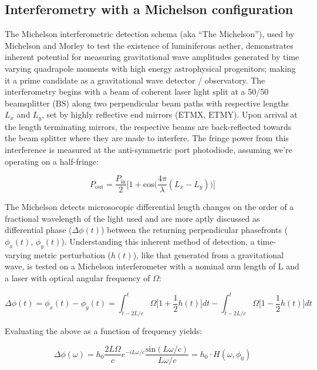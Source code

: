 \subsection{Interferometry with a Michelson configuration}
The Michelson interferometric detection schema (aka ``The Michelson''), used by Michelson and Morley to test the existence of luminiferous aether, demonstrates inherent potential for measuring gravitational wave amplitudes generated by time varying quadrapole moments with high energy astrophysical progenitors; making it a prime candidate as a gravitational wave detector / observatory. The interferometry begins with a beam of coherent laser light split at a 50/50 beamsplitter ($\mathrm{BS}$) along two perpendicular beam paths with respective lengths $L_x$ and $L_y$, set by highly reflective end mirrors ($\mathrm{ETMX}$, $\mathrm{ETMY}$). Upon arrival at the length terminating mirrors, the respective beams are back-reflected towards the beam splitter where they are made to interfere. The fringe power from this interference is measured at the anti-symmetric port photodiode, assuming we're operating on a half-fringe: 

\begin{equation}\label{fig:pmichas}
	P_\mathrm{out} = \frac{P_\mathrm{in}}{2} \bigg[1+\mathrm{cos}\Big(\frac{4\pi}{\lambda} (L_x - L_y)\Big) \bigg]
\end{equation}

The Michelson detects microsocopic differential length changes on the order of a fractional wavelength of the light used and are more aptly discussed as differential phase ($\Delta \phi(t)$) between the returning perpendicular phasefronts ($\phi_x(t)$, $\phi_y(t)$). Understanding this inherent method of detection, a time-varying metric perturbation ($h(t)$), like that generated from a gravitational wave, is tested on a Michelson interferometer with a nominal arm length of L and a laser with optical angular frequency of $\Omega$:

\begin{equation}
\Delta \phi(t) = \phi_x(t) - \phi_y(t) =  \int_{t-2L/c}^{t} \Omega \bigg[1 + \frac{1}{2}h(t)\bigg]dt - \int_{t-2L/c}^{t} \Omega \bigg[1 - \frac{1}{2}h(t)\bigg]dt 
\end{equation}

\noindent Evaluating the above as a function of frequency yields:

\begin{equation}\label{fig:michdelphi}
	\Delta \phi (\omega) = h_0\frac{2 L \Omega}{c}e^{-i L \omega / c} \frac{\mathrm{sin}(L \omega /c)}{L \omega /c} = h_0 \cdot H(\omega, \phi_0)
\end{equation}


